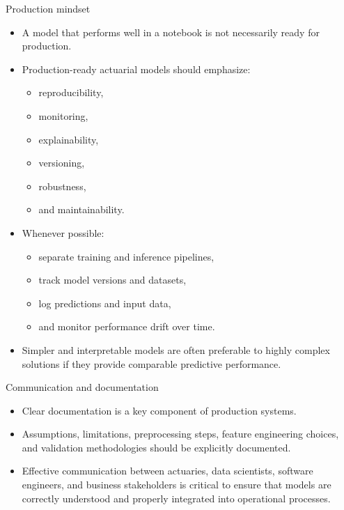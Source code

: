 \documentclass[
  ignorenonframetext,
]{beamer}
\providecommand{\tightlist}{%
  \setlength{\itemsep}{0pt}\setlength{\parskip}{0pt}}
\begin{document}
\begin{frame}
\begin{block}{Production mindset}
\label{production-mindset}
\begin{itemize}
\tightlist
\item
  A model that performs well in a notebook is not necessarily ready for
  production.
\item
  Production-ready actuarial models should emphasize:

  \begin{itemize}
  \tightlist
  \item
    reproducibility,
  \item
    monitoring,
  \item
    explainability,
  \item
    versioning,
  \item
    robustness,
  \item
    and maintainability.
  \end{itemize}
\item
  Whenever possible:

  \begin{itemize}
  \tightlist
  \item
    separate training and inference pipelines,
  \item
    track model versions and datasets,
  \item
    log predictions and input data,
  \item
    and monitor performance drift over time.
  \end{itemize}
\item
  Simpler and interpretable models are often preferable to highly
  complex solutions if they provide comparable predictive performance.
\end{itemize}
\end{block}
\end{frame}

\begin{frame}
\begin{block}{Communication and documentation}
\label{communication-and-documentation}
\begin{itemize}
\tightlist
\item
  Clear documentation is a key component of production systems.
\item
  Assumptions, limitations, preprocessing steps, feature engineering
  choices, and validation methodologies should be explicitly documented.
\item
  Effective communication between actuaries, data scientists, software
  engineers, and business stakeholders is critical to ensure that models
  are correctly understood and properly integrated into operational
  processes.
\end{itemize}
\end{block}
\end{frame}
\end{document}
